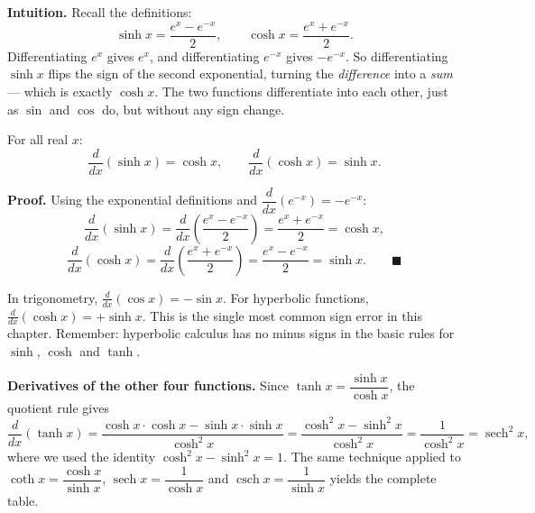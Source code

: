 \documentclass[11pt]{article}
\newcommand{\cle}[1]{{\popxbold\color{popdark}#1}}
\begin{document}
\textbf{Intuition.} Recall the definitions:
\[
\sinh x = \frac{e^x - e^{-x}}{2}, \qquad \cosh x = \frac{e^x + e^{-x}}{2}.
\]
Differentiating $e^x$ gives $e^x$, and differentiating $e^{-x}$ gives $-e^{-x}$. So differentiating $\sinh x$ flips the sign of the second exponential, turning the \emph{difference} into a \emph{sum} --- which is exactly $\cosh x$. The two functions differentiate into each other, just as $\sin$ and $\cos$ do, but without any sign change.

\begin{propriete}
For all real $x$:
\[
\frac{d}{dx}(\sinh x) = \cosh x, \qquad \frac{d}{dx}(\cosh x) = \sinh x.
\]
\end{propriete}

\textbf{Proof.} Using the exponential definitions and $\dfrac{d}{dx}(e^{-x}) = -e^{-x}$:
\[
\frac{d}{dx}(\sinh x) = \frac{d}{dx}\left(\frac{e^x - e^{-x}}{2}\right) = \frac{e^x + e^{-x}}{2} = \cosh x,
\]
\[
\frac{d}{dx}(\cosh x) = \frac{d}{dx}\left(\frac{e^x + e^{-x}}{2}\right) = \frac{e^x - e^{-x}}{2} = \sinh x. \qquad \blacksquare
\]

\begin{attention}
In trigonometry, $\frac{d}{dx}(\cos x) = -\sin x$. For hyperbolic functions, $\frac{d}{dx}(\cosh x) = +\sinh x$. This is the single most common sign error in this chapter. Remember: \cle{hyperbolic calculus has no minus signs} in the basic rules for $\sinh$, $\cosh$ and $\tanh$.
\end{attention}

\textbf{Derivatives of the other four functions.} Since $\tanh x = \dfrac{\sinh x}{\cosh x}$, the quotient rule gives
\[
\frac{d}{dx}(\tanh x) = \frac{\cosh x \cdot \cosh x - \sinh x \cdot \sinh x}{\cosh^2 x} = \frac{\cosh^2 x - \sinh^2 x}{\cosh^2 x} = \frac{1}{\cosh^2 x} = \operatorname{sech}^2 x,
\]
where we used the identity $\cosh^2 x - \sinh^2 x = 1$. The same technique applied to $\coth x = \dfrac{\cosh x}{\sinh x}$, $\operatorname{sech} x = \dfrac{1}{\cosh x}$ and $\operatorname{csch} x = \dfrac{1}{\sinh x}$ yields the complete table.
\end{document}
